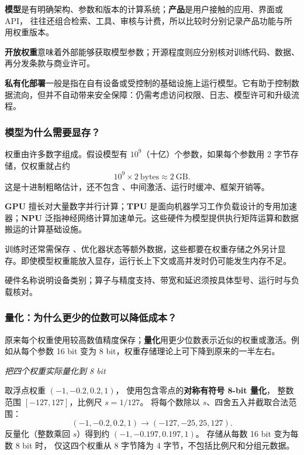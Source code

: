 \textbf{模型}是有明确架构、参数和版本的计算系统；\textbf{产品}是用户接触的应用、界面或 API，
往往还组合检索、工具、审核与计费，所以比较时分别记录产品功能与所用权重版本。

\textbf{开放权重}意味着外部能够获取模型参数；开源程度则应分别核对训练代码、数据、再分发条款与商业许可。

\textbf{私有化部署}一般是指在自有设备或受控制的基础设施上运行模型。它有助于控制数据流向，但并不自动带来安全保障：仍需考虑访问权限、日志、模型许可和升级流程。

\subsubsection*{模型为什么需要显存？}

权重由许多数字组成。假设模型有 $10^9$（十亿）个参数，如果每个参数用 2 字节存储，仅权重就占约
\[
10^9\times2\ \text{bytes}\approx2\ \text{GB}.
\]
这是十进制粗略估计，还不包含 、中间激活、运行时缓冲、框架开销等。

\textbf{GPU} 擅长对大量数字并行计算；\textbf{TPU} 是面向机器学习工作负载设计的专用加速器；\textbf{NPU} 泛指神经网络计算加速单元。这些硬件为模型提供执行矩阵运算和数据搬运的计算基础设施。

\begin{warningbox}
训练时还常需保存 、优化器状态等额外数据，这些都要在权重存储之外另计显存。即使模型权重能放入显存，运行长上下文或高并发时仍可能发生内存不足。

硬件名称说明设备类别；算子与精度支持、带宽和延迟须按具体型号、运行时与负载核对。
\end{warningbox}


\subsubsection*{量化：为什么更少的位数可以降低成本？}
\label{concept:quant}

原来每个权重使用较高数值精度保存；\textbf{量化}用更少位数表示近似的权重或激活。例如从每个参数 16 bit 变为 8 bit，权重存储理论上可下降到原来的一半左右。

\begin{example}
\noindent\emph{把四个权重实际量化到 8 bit}\par

取浮点权重 $(-1,-0.2,0.2,1)$，
使用包含零点的\textbf{对称有符号 8-bit 量化}，
整数范围 $[-127,127]$，比例尺 $s=1/127$。
将每个数除以 $s$、四舍五入并截取合法范围：
\[
(-1,-0.2,0.2,1)
\longrightarrow(-127,-25,25,127).
\]
反量化（整数乘回 $s$）得到约
$(-1,-0.197,0.197,1)$。
存储从每数 16 bit 变为每数 8 bit 时，
仅这四个权重从 8 字节降为 4 字节，不包括比例尺和分组元数据。
\end{example}

